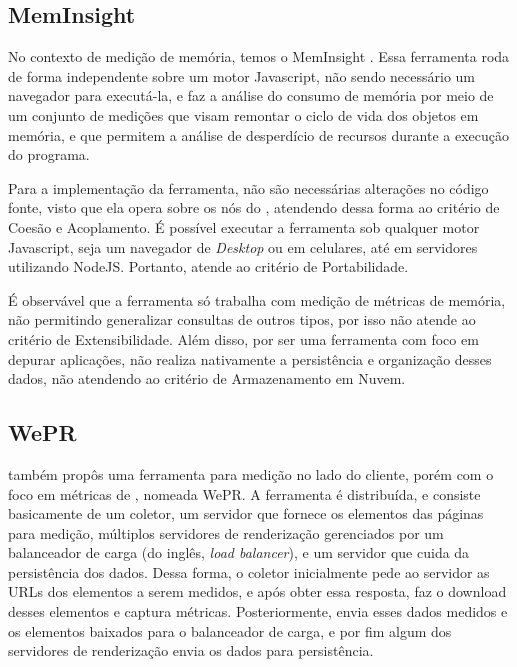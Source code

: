 \documentclass[12pt]{tcc}
\begin{document}
	\subsection{MemInsight}
	\label{subsection:meminsight}

	No contexto de medição de memória, temos o MemInsight \citep{Jensen2015MemInsight}. Essa ferramenta roda de forma independente sobre um motor Javascript, não sendo necessário um navegador para executá-la, e faz a análise do consumo de memória por meio de um conjunto de medições que visam remontar o ciclo de vida dos objetos em memória, e que permitem a análise de desperdício de recursos durante a execução do programa. 

	Para a implementação da ferramenta, não são necessárias alterações no código fonte, visto que ela opera sobre os nós do , atendendo dessa forma ao critério de Coesão e Acoplamento. É possível executar a ferramenta sob qualquer motor Javascript, seja um navegador de \emph{Desktop} ou em celulares, até em servidores utilizando NodeJS. Portanto, atende ao critério de Portabilidade.


	É observável que a ferramenta só trabalha com medição de métricas de memória, não permitindo generalizar consultas de outros tipos, por isso não atende ao critério de Extensibilidade. Além disso, por ser uma ferramenta com foco em depurar aplicações, não realiza nativamente a persistência e organização desses dados, não atendendo ao critério de Armazenamento em Nuvem.		

	\subsection{WePR}
	\label{WePR}
	\par \citet{Asrese2019MeasuringWL} também propôs uma ferramenta para medição no lado do cliente, porém com o foco em métricas de , nomeada WePR. A ferramenta é distribuída, e consiste basicamente de um coletor, um servidor que fornece os elementos das páginas para medição, múltiplos servidores de renderização gerenciados por um balanceador de carga (do inglês, \emph{load balancer}), e um servidor que cuida da persistência dos dados. Dessa forma, o coletor inicialmente pede ao servidor as URLs dos elementos a serem medidos, e após obter essa resposta, faz o download desses elementos e captura métricas. Posteriormente, envia esses dados medidos e os elementos baixados para o balanceador de carga, e por fim algum dos servidores de renderização envia os dados para persistência. 
\end{document}

